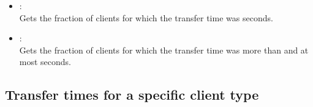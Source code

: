 \begin{itemize}
\item
{}:\\
Gets the fraction of clients for which the transfer time was  seconds.

\item
{}:\\
Gets the fraction of clients for which the transfer time was more than  and at most  seconds.

\end{itemize}  



\subsection{Transfer times for a specific client type}

